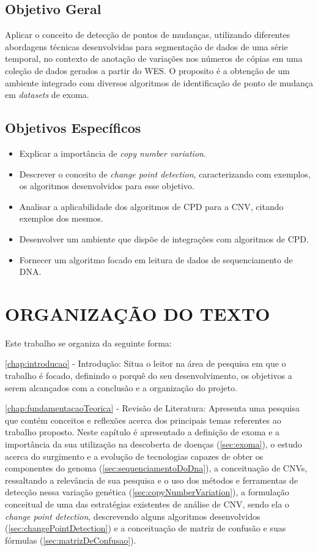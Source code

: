 \subsection{Objetivo Geral}

Aplicar o conceito de detecção de pontos de mudanças, utilizando diferentes abordagens técnicas desenvolvidas para segmentação de dados de uma série temporal, no contexto de anotação de variações nos números de cópias em uma coleção de dados gerados a partir do WES. O proposito é a obtenção de um ambiente integrado com diversos algoritmos de identificação de ponto de mudança em \textit{datasets} de exoma.

\subsection{Objetivos Específicos}
	
\begin{itemize}
    \item Explicar a importância de \textit{copy number variation}.
    \item Descrever o conceito de \textit{change point detection}, caracterizando com exemplos, os algoritmos desenvolvidos para esse objetivo.
    \item Analisar a aplicabilidade dos algoritmos de CPD para a CNV, citando exemplos dos mesmos.
    \item Desenvolver um ambiente que dispõe de integrações com algoritmos de CPD.
    \item Fornecer um algoritmo focado em leitura de dados de sequenciamento de DNA.
\end{itemize}

\section{ORGANIZAÇÃO DO TEXTO}

Este trabalho se organiza da seguinte forma:

\autoref{chap:introducao} - Introdução: Situa o leitor na área de pesquisa em que o trabalho é focado, definindo o porquê do seu desenvolvimento, os objetivos a serem alcançados com a conclusão e a organização do projeto.

\autoref{chap:fundamentacaoTeorica} - Revisão de Literatura: Apresenta uma pesquisa que contém conceitos e reflexões acerca dos principais temas referentes ao trabalho proposto. Neste capítulo é apresentado a definição de exoma e a importância da sua utilização na descoberta de doenças (\autoref{sec:exoma}), o estudo acerca do surgimento e a evolução de tecnologias capazes de obter os componentes do genoma (\autoref{sec:sequenciamentoDoDna}), a conceituação de CNVs, ressaltando a relevância de sua pesquisa e o uso dos métodos e ferramentas de detecção nessa variação genética (\autoref{sec:copyNumberVariation}), a formulação conceitual de uma das estratégias existentes de análise de CNV, sendo ela o \textit{change point detection}, descrevendo alguns algoritmos desenvolvidos (\autoref{sec:changePointDetection}) e a conceituação de matriz de confusão e suas fórmulas (\autoref{sec:matrizDeConfusao}).

